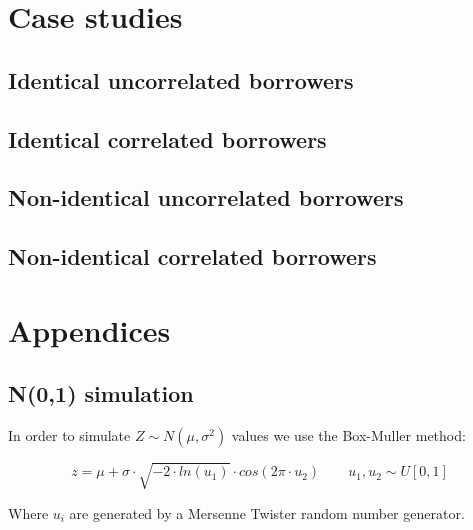 \documentclass[a4paper,12pt,final]{article}
\begin{document}
\FloatBarrier


\section{Case studies}

\subsection{Identical uncorrelated borrowers}

\subsection{Identical correlated borrowers}

\subsection{Non-identical uncorrelated borrowers}

\subsection{Non-identical correlated borrowers}


\newpage
\appendix
\section{Appendices}

\subsection{N(0,1) simulation}
\label{ap:normsim}

In order to simulate $Z \sim N(\mu, \sigma^2)$ values we use the Box-Muller 
method:

\begin{displaymath}
z = \mu + \sigma\cdot \sqrt{-2 \cdot ln(u_1)} \cdot cos(2 \pi \cdot u_2)
\qquad u_1, u_2 \sim U[0,1]
\end{displaymath}

Where $u_i$ are generated by a Mersenne Twister random number generator.
\end{document}
